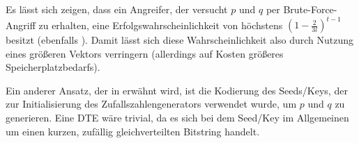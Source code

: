 Es lässt sich zeigen, dass ein Angreifer, der versucht \(p\) und \(q\) per Brute-Force-Angriff zu erhalten, eine Erfolgswahrscheinlichkeit von höchstens \((1-\frac{2}{3l})^{t-1}\) besitzt (ebenfalls \cite{EURO2014}). Damit lässt sich diese Wahrscheinlichkeit also durch Nutzung eines größeren Vektors verringern (allerdings auf Kosten größeres Speicherplatzbedarfs).

Ein anderer Ansatz, der in \cite{EURO2014} erwähnt wird, ist die Kodierung des Seeds/Keys, der zur Initialisierung des Zufallszahlengenerators verwendet wurde, um \(p\) und \(q\) zu generieren. Eine DTE wäre trivial, da es sich bei dem Seed/Key im Allgemeinen um einen kurzen, zufällig gleichverteilten Bitstring handelt.
